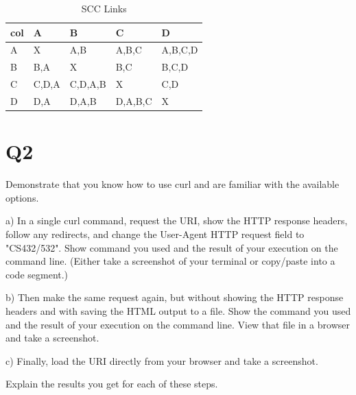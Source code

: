 \documentclass[12pt]{article}
\begin{document}
\begin{table}[h]
\centering
\caption{SCC Links}
\label{tbl:scclinks}
\begin{tabular}{|l|l|l|l|l|}
\hline
\textbf{col} & \textbf{A} & \textbf{B} & \textbf{C} & \textbf{D} \\ \hline \hline
A & X & A,B & A,B,C & A,B,C,D \\ \hline
B & B,A & X & B,C & B,C,D \\ \hline
C & C,D,A & C,D,A,B & X & C,D \\ \hline
D & D,A & D,A,B & D,A,B,C & X \\ \hline
\end{tabular}
\end{table}

\section*{Q2}
Demonstrate that you know how to use curl and are familiar with the available options.



a) In a single curl command, request the URI, show the HTTP response headers, follow any redirects, and change the User-Agent HTTP request field to "CS432/532". Show command you used and the result of your execution on the command line. (Either take a screenshot of your terminal or copy/paste into a code segment.)

b) Then make the same request again, but without showing the HTTP response headers and with saving the HTML output to a file. Show the command you used and the result of your execution on the command line. View that file in a browser and take a screenshot.

c) Finally, load the URI directly from your browser and take a screenshot.

Explain the results you get for each of these steps.
\end{document}
